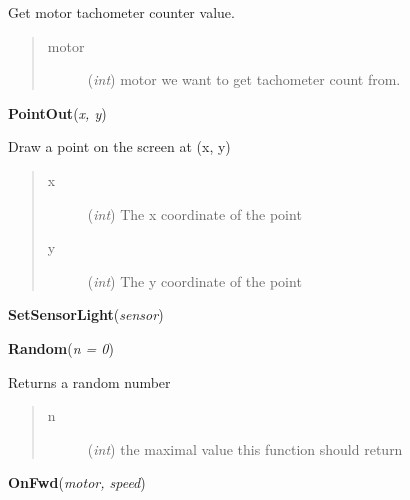 \documentclass[10pt,a4paper]{article}
\begin{document}
    Get motor tachometer counter value.





\begin{quote}
    \begin{description}
        
\item[motor] ({\emph{int}}) motor we want to get tachometer count from.

    \end{description}
\end{quote}

 

\vspace{6pt}
{\bf PointOut}({\it x, y}) 
    
    Draw a point on the screen at (x, y)



    


\begin{quote}
    \begin{description}
        
\item[x] ({\emph{int}}) The x coordinate of the point

\item[y] ({\emph{int}}) The y coordinate of the point

    \end{description}
\end{quote}

 

\vspace{6pt}
{\bf SetSensorLight}({\it sensor}) 

 

\vspace{6pt}
{\bf Random}({\it n = 0}) 
    
    Returns a random number





\begin{quote}
    \begin{description}
        
\item[n] ({\emph{int}}) the maximal value this function should return

    \end{description}
\end{quote}

 

\vspace{6pt}
{\bf OnFwd}({\it motor, speed}) 
  
\end{document}
